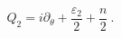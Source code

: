 \begin{equation}
Q_2 = i\partial_\theta +\frac{\varepsilon_2}{2}+ \frac{n}{2}~.
\label{Q2}
\end{equation} 
